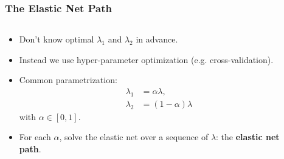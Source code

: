 \documentclass[aspectratio=1610,onlytextwidth]{beamer}
\begin{document}
\begin{frame}[c]
  \frametitle{The Elastic Net Path}

  \begin{columns}
    \begin{column}{0.55\textwidth}
      \begin{itemize}[<+->]
        \item Don't know optimal \(\lambda_1\) and \(\lambda_2\) in advance.
        \item Instead we use hyper-parameter optimization (e.g. cross-validation).
        \item Common parametrization:
              \begin{align*}
                \lambda_1 & = \alpha\lambda,     \\
                \lambda_2 & = (1- \alpha)\lambda
              \end{align*}
              with \(\alpha \in [0, 1]\).
        \item For each \(\alpha\), solve the elastic net over a sequence of \(\lambda\): the
              \textbf{elastic net path}.
      \end{itemize}
    \end{column}
    \begin{column}{0.4\textwidth}
    \end{column}
  \end{columns}

\end{frame}
\end{document}
